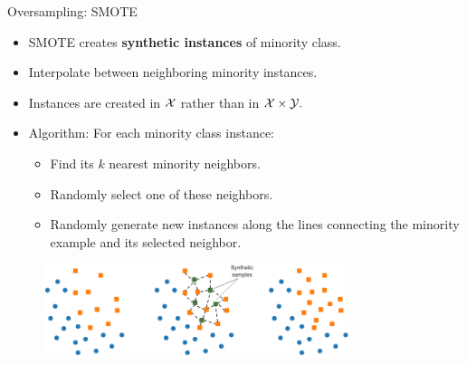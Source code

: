 \documentclass[11pt,compress,t,notes=noshow, xcolor=table]{beamer}
\begin{document}
\begin{frame}{Oversampling: SMOTE}
    \begin{itemize}
        \item SMOTE creates \textbf{synthetic instances} of minority class.

        \item Interpolate between neighboring minority instances.

        \item Instances are created in $\mathcal{X}$ rather than in $\mathcal{X}\times\mathcal{Y}.$

        \item Algorithm: For each minority class instance: 

        \begin{itemize} 

            \item Find its $k$ nearest minority neighbors.
    
            \item Randomly select one of these neighbors.
    
            \item Randomly generate new instances along the lines connecting the minority example and its selected neighbor.
    
        \end{itemize}
    \end{itemize}
    
    \begin{figure}
        \centering
        \includegraphics[width=0.8\textwidth]{figure/SMOTE.png} 
    \end{figure}


\end{frame}
\end{document}

